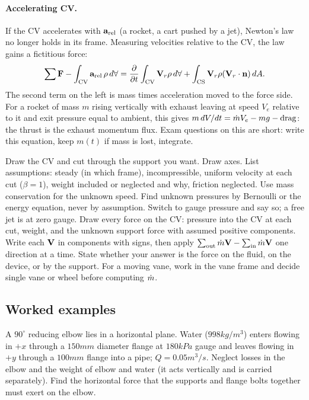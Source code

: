 \paragraph{Accelerating CV.} If the CV accelerates with $\mathbf{a}_\text{rel}$ (a rocket, a cart pushed by a jet), Newton's law no longer holds in its frame. Measuring velocities relative to the CV, the law gains a fictitious force:
\[
\sum\mathbf{F} - \int_\text{CV}\mathbf{a}_\text{rel}\,\rho\,d\forall = \frac{\partial }{\partial t}\int_\text{CV}\mathbf{V}_r\rho\,d\forall + \int_\text{CS}\mathbf{V}_r\rho(\mathbf{V}_r\cdot\mathbf{n})\,dA .
\]
The second term on the left is mass times acceleration moved to the force side. For a rocket of mass $m$ rising vertically with exhaust leaving at speed $V_e$ relative to it and exit pressure equal to ambient, this gives $m\,dV/dt = \dot m V_e - mg - \text{drag}$: the thrust is the exhaust momentum flux. Exam questions on this are short: write this equation, keep $m(t)$ if mass is lost, integrate.

\begin{firstmoves}
Draw the CV and cut through the support you want. Draw axes. List assumptions: steady (in which frame), incompressible, uniform velocity at each cut ($\beta = 1$), weight included or neglected and why, friction neglected. Use mass conservation for the unknown speed. Find unknown pressures by Bernoulli or the energy equation, never by assumption. Switch to gauge pressure and say so; a free jet is at zero gauge. Draw every force on the CV: pressure into the CV at each cut, weight, and the unknown support force with assumed positive components. Write each $\mathbf{V}$ in components with signs, then apply $\sum_\text{out}\dot m\mathbf{V} - \sum_\text{in}\dot m\mathbf{V}$ one direction at a time. State whether your answer is the force on the fluid, on the device, or by the support. For a moving vane, work in the vane frame and decide single vane or wheel before computing $\dot m$.
\end{firstmoves}

\subsection*{Worked examples}

\begin{example}
A $90^\circ$ reducing elbow lies in a horizontal plane. Water ($998\unit{kg/m^3}$) enters flowing in $+x$ through a $150\unit{mm}$ diameter flange at $180\unit{kPa}$ gauge and leaves flowing in $+y$ through a $100\unit{mm}$ flange into a pipe; $Q = 0.05\unit{m^3/s}$. Neglect losses in the elbow and the weight of elbow and water (it acts vertically and is carried separately). Find the horizontal force that the supports and flange bolts together must exert on the elbow.
\end{example}

